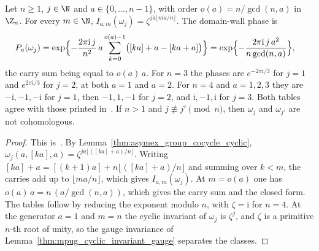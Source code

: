 \begin{lemma}
    \label{thm:asymex_group_cocycle_cyclic_domain_wall}
    \leanok
    Let $n\geq1$, $j\in\N$ and $a\in\{0,\ldots,n-1\}$, with order
    $o(a)=n/\gcd(n,a)$ in $\Z_n$. For every $m\in\N$,
    $I_{a,m}(\omega_j)=\zeta^{ja\lfloor ma/n\rfloor}$. The domain-wall phase is
    \begin{align}
        P_a(\omega_j)
         & =\exp\Bigl\{-\frac{2\pi\mathrm{i}\,j}{n^2}\,a
        \sum_{k=0}^{o(a)-1}\bigl([ka]+a-[ka+a]\bigr)\Bigr\}
        =\exp\Bigl\{-\frac{2\pi\mathrm{i}\,j\,a^2}{n\gcd(n,a)}\Bigr\},
        \notag
    \end{align}
    the carry sum being equal to $o(a)\,a$. For $n=3$ the phases are
    $e^{-2\pi\mathrm{i}/3}$ for $j=1$ and $e^{2\pi\mathrm{i}/3}$ for $j=2$, at
    both $a=1$ and $a=2$. For $n=4$ and $a=1,2,3$ they are
    $-\mathrm{i},-1,-\mathrm{i}$ for $j=1$, then $-1,1,-1$ for $j=2$, and
    $\mathrm{i},-1,\mathrm{i}$ for $j=3$. Both tables agree with those printed
    in~\cite[Section~IV.D]{GarreRubioSchuch2024DomainWall}. If $n>1$ and
    $j\not\equiv j'\pmod n$, then $\omega_j$ and $\omega_{j'}$ are not
    cohomologous.
\end{lemma}

\begin{proof}
    \leanok
    This is~\cite[``Domain-wall phases of the cyclic
        cocycles'']{QICLean2026Blueprint}.
    By Lemma~\ref{thm:asymex_group_cocycle_cyclic},
    $\omega_j(a,[ka],a)=\zeta^{ja\lfloor([ka]+a)/n\rfloor}$. Writing
    $[ka]+a=[(k+1)a]+n\lfloor([ka]+a)/n\rfloor$ and summing over $k<m$, the
    carries add up to $\lfloor ma/n\rfloor$, which gives $I_{a,m}(\omega_j)$.
    At $m=o(a)$ one has $o(a)\,a=n\,(a/\gcd(n,a))$, which gives the carry sum
    and the closed form. The tables follow by reducing the exponent modulo
    $n$, with $\zeta=\mathrm{i}$ for $n=4$. At the generator $a=1$ and $m=n$
    the cyclic invariant of $\omega_j$ is $\zeta^j$, and $\zeta$ is a
    primitive $n$-th root of unity, so the gauge invariance of
    Lemma~\ref{thm:mpug_cyclic_invariant_gauge} separates the classes.
\end{proof}

